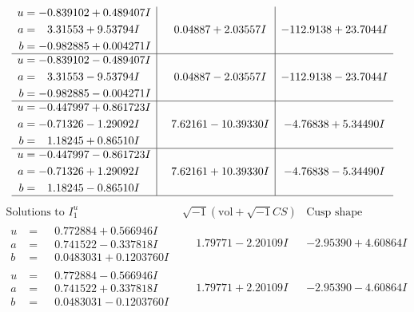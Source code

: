 \documentclass[1p]{elsarticle_modified}
\theoremstyle{definition}
\newcommand{\I}{\sqrt{-1}}
\begin{document}
$$\begin{array}{c|c|c}
\begin{aligned}
u &= -0.839102 + 0.489407 I \\
a &= \phantom{-}3.31553 + 9.53794 I \\
b &= -0.982885 + 0.004271 I\end{aligned}
 & \phantom{-}0.04887 + 2.03557 I & -112.9138 + 23.7044 I \\ \hline\begin{aligned}
u &= -0.839102 - 0.489407 I \\
a &= \phantom{-}3.31553 - 9.53794 I \\
b &= -0.982885 - 0.004271 I\end{aligned}
 & \phantom{-}0.04887 - 2.03557 I & -112.9138 - 23.7044 I \\ \hline\begin{aligned}
u &= -0.447997 + 0.861723 I \\
a &= -0.71326 - 1.29092 I \\
b &= \phantom{-}1.18245 + 0.86510 I\end{aligned}
 & \phantom{-}7.62161 - 10.39330 I & -4.76838 + 5.34490 I \\ \hline\begin{aligned}
u &= -0.447997 - 0.861723 I \\
a &= -0.71326 + 1.29092 I \\
b &= \phantom{-}1.18245 - 0.86510 I\end{aligned}
 & \phantom{-}7.62161 + 10.39330 I & -4.76838 - 5.34490 I\\
 \hline 
 \end{array}$$\newpage$$\begin{array}{c|c|c}  
\text{Solutions to }I^u_{1}& \I (\text{vol} + \sqrt{-1}CS) & \text{Cusp shape}\\
 \hline 
\begin{aligned}
u &= \phantom{-}0.772884 + 0.566946 I \\
a &= \phantom{-}0.741522 - 0.337818 I \\
b &= \phantom{-}0.0483031 + 0.1203760 I\end{aligned}
 & \phantom{-}1.79771 - 2.20109 I & -2.95390 + 4.60864 I \\ \hline\begin{aligned}
u &= \phantom{-}0.772884 - 0.566946 I \\
a &= \phantom{-}0.741522 + 0.337818 I \\
b &= \phantom{-}0.0483031 - 0.1203760 I\end{aligned}
 & \phantom{-}1.79771 + 2.20109 I & -2.95390 - 4.60864 I \\ \hline\begin{aligned}

\end{aligned}
\end{array}$$
\end{document}
